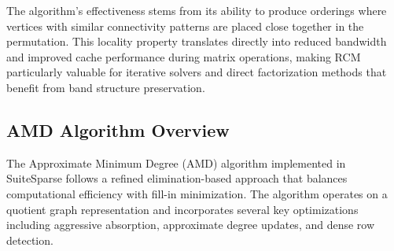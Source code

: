 The algorithm's effectiveness stems from its ability to produce orderings where vertices with similar connectivity patterns are placed close together in the permutation. This locality property translates directly into reduced bandwidth and improved cache performance during matrix operations, making RCM particularly valuable for iterative solvers and direct factorization methods that benefit from band structure preservation.

\subsection{AMD Algorithm Overview}

The Approximate Minimum Degree (AMD) algorithm implemented in SuiteSparse follows a refined elimination-based approach that balances computational efficiency with fill-in minimization. The algorithm operates on a quotient graph representation and incorporates several key optimizations including aggressive absorption, approximate degree updates, and dense row detection.

